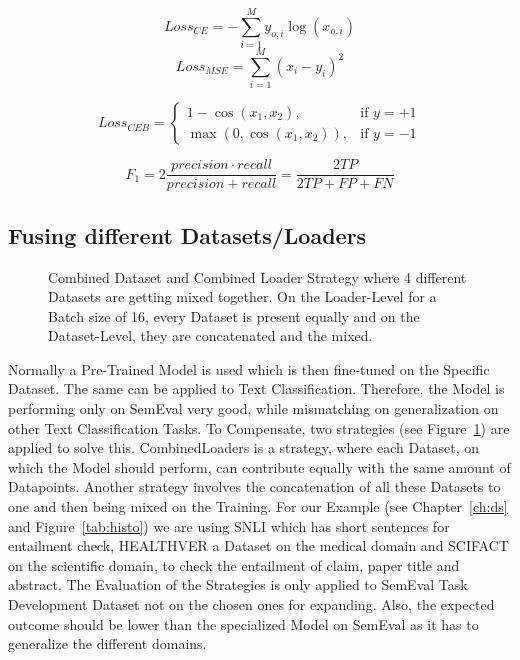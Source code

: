 \begin{equation}\label{eq:ce}
   Loss_{CE} = -\sum_{i=1}^My_{o,i}\log(x_{o,i})
\end{equation}
\begin{equation}\label{eq:mse}
   Loss_{MSE} = \sum_{i=1}^{M}(x_i-y_i)^2
\end{equation}

\begin{equation}\label{eq:ceb}
    Loss_{CEB} = \begin{cases}
        1 - \cos(x_1, x_2),      &\text{if $y = +1$}\\
        \max(0, \cos(x_1, x_2)), &\text{if $y = -1$}
    \end{cases}
\end{equation}

\begin{equation}\label{eq:f}
    F_1 = 2 \frac{precision \cdot recall}{precision + recall} = \frac{2 TP}{2TP + FP + FN}
 \end{equation}


 



\subsection{Fusing different Datasets/Loaders}
\begin{figure}[b]
    \centering
    \resizebox{\textwidth}{!}{}
    \caption{Combined Dataset and Combined Loader Strategy where 4 different Datasets are getting mixed together.
             On the Loader-Level for a Batch size of 16, every Dataset is present equally and on the
             Dataset-Level, they are concatenated and the mixed.}\label{fig:test}
\end{figure}


Normally a Pre-Trained Model is used which is then fine-tuned on the Specific Dataset. The same can be applied to
Text Classification. Therefore, the Model is performing only on SemEval very good, while mismatching on generalization
on other Text Classification Tasks. To Compensate, two strategies (see Figure~\ref{fig:test}) are applied to solve this.
CombinedLoaders is a strategy, where each Dataset, on which the Model should perform, can contribute equally with
the same amount of Datapoints. Another strategy involves the concatenation of all these Datasets to one and then being
mixed on the Training. For our Example (see Chapter~\ref{ch:ds} and Figure~\ref{tab:histo}) we are using SNLI \cite{noauthor_snli_2023}
which has short sentences for entailment check, HEALTHVER \cite{noauthor_dwaddenhealthver_entailment_nodate} a Dataset on the medical domain and
SCIFACT \cite{noauthor_allenaiscifact_entailment_nodate} on the scientific domain, to check the entailment of claim, 
paper title and abstract. The Evaluation of the Strategies is only applied to SemEval Task Development
Dataset not on the chosen ones for expanding. Also, the expected outcome should be lower than the
specialized Model on SemEval as it has to generalize the different domains.


